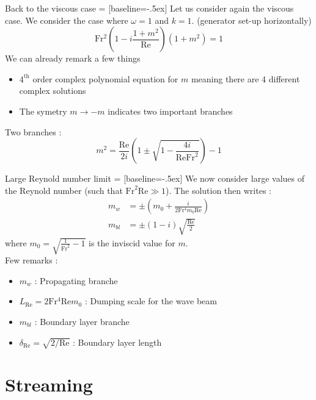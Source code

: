 \documentclass[10pt]{beamer}
\begin{document}
\begin{frame}[fragile]{Back to the viscous case}
   = [baseline=-.5ex]
  Let us consider again the viscous case. We consider the case where $\omega=1$ and $k=1$. (generator set\--up horizontally)
  \begin{equation*}
    \mathrm{Fr^{2}}\left(1-i\frac{1+m^{2}}{\mathrm{Re}}\right)\left(1+m^{2}\right)=1
  \end{equation*}
  We can already remark a few things
  \begin{itemize}
    \item $4^{\mathrm{th}}$ order complex polynomial equation for $m$ meaning there are 4 different complex solutions
    \item The symetry $m\to-m$ indicates two important branches
  \end{itemize}
  Two branches :
  \begin{equation*}
    m^{2}=\frac{\mathrm{Re}}{2i}\left(1\pm\sqrt{1-\frac{4i}{\mathrm{Re}\mathrm{Fr}^{2}}}\right)-1
  \end{equation*}
\end{frame}

\begin{frame}[fragile]{Large Reynold number limit}
   = [baseline=-.5ex]
  We now consider large values of the Reynold number (such that $\mathrm{Fr}^2\mathrm{Re}\gg1$). The solution then writes :
  \begin{align*}
    m_{w}&=\pm\left(m_{0}+\frac{i}{2\mathrm{Fr^{4}}m_{0}\mathrm{Re}}\right)\\
    m_{bl}&=\pm \left(1-i\right)\sqrt{\frac{\mathrm{Re}}{2}}
  \end{align*}
  where $m_{0}=\sqrt{\frac{1}{\mathrm{Fr}^{2}}-1}$ is the inviscid value for $m$.\\
  Few remarks :
  \begin{itemize}
    \item $m_{w}$ : Propagating branche
    \item $L_{\mathrm{Re}}=2\mathrm{Fr^{4}}\mathrm{Re}m_{0}$ : Dumping scale for the wave beam
    \item $m_{bl}$ : Boundary layer branche
    \item $\delta_{\mathrm{Re}}=\sqrt{2/\mathrm{Re}}$ : Boundary layer length
  \end{itemize}
\end{frame}

\section{Streaming}
\end{document}
